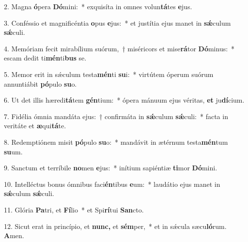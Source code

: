 \item 2. Magna \textbf{ó}pera \textbf{Dó}mini:~* exquisíta in omnes volun\textbf{tá}tes \textbf{e}jus.

\item 3. Conféssio et magnificéntia \textbf{o}pus \textbf{e}jus:~* et justítia ejus manet in \textbf{sǽ}culum \textbf{sǽ}culi.

\item 4. Memóriam fecit mirabílium suórum,~† miséricors et mise\textbf{rá}tor \textbf{Dó}minus:~* escam dedit ti\textbf{mén}ti\textbf{bus} se.

\item 5. Memor erit in sǽculum testa\textbf{mén}ti \textbf{su}i:~* virtútem óperum suórum annuntiábit \textbf{pó}pulo \textbf{su}o.

\item 6. Ut det illis hæredi\textbf{tá}tem \textbf{gén}tium:~* ópera mánuum ejus véritas, \textbf{et} ju\textbf{dí}cium.

\item 7. Fidélia ómnia mandáta ejus:~† confirmáta in \textbf{sǽ}culum \textbf{sǽ}culi:~* facta in veritáte et \textbf{æ}qui\textbf{tá}te.

\item 8. Redemptiónem misit \textbf{pó}pulo \textbf{su}o:~* mandávit in ætérnum testa\textbf{mén}tum \textbf{su}um.

\item 9. San\-ctum et terríbile \textbf{no}men \textbf{e}jus:~* inítium sapiéntiæ \textbf{ti}mor \textbf{Dó}mini.

\item 10. Intelléctus bonus ómnibus faci\textbf{én}tibus \textbf{e}um:~* laudátio ejus manet in \textbf{sǽ}culum \textbf{sǽ}culi.

\item 11. Glória \textbf{Pa}tri, et \textbf{Fí}lio~* et Spi\textbf{rí}tui \textbf{San}cto.

\item 12. Sicut erat in princípio, et \textbf{nunc,} et \textbf{sém}per,~* et in sǽcula sæcu\textbf{ló}rum. \textbf{A}men.
